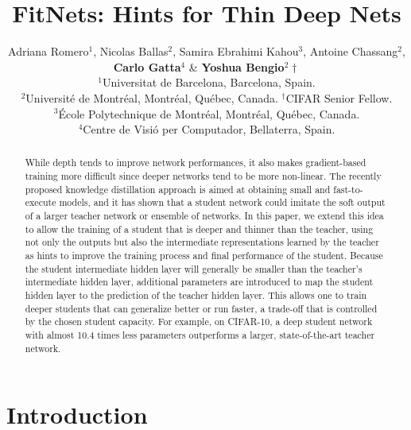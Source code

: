 \documentclass{article} %
\title{FitNets: Hints for Thin Deep Nets}
\author{
Adriana Romero$^1$, Nicolas Ballas$^2$, Samira Ebrahimi Kahou$^3$, Antoine Chassang$^2$,\\
{\bf Carlo Gatta$^4$} \& {\bf Yoshua Bengio$^2\dagger$}\\
$^1$Universitat de Barcelona, Barcelona, Spain. \\
$^2$Universit\'e de Montr\'eal, Montr\'eal, Qu\'ebec, Canada. $^\dagger$CIFAR Senior Fellow.\\
$^3$\'Ecole Polytechnique de Montr\'eal, Montr\'eal, Qu\'ebec, Canada. \\
$^4$Centre de Visi\'o per Computador, Bellaterra, Spain.
}
\begin{document}
\maketitle


\begin{abstract}
While depth tends to improve network performances, it also makes
gradient-based training more difficult since deeper networks tend to be more
non-linear. The recently proposed knowledge distillation approach is aimed at obtaining small
and fast-to-execute models, and it has shown that a student network could imitate
the soft output of a larger teacher network or ensemble of networks.  In this
paper, we extend this idea to allow the training of a student that is deeper and
thinner than the teacher, using not only the outputs but also the intermediate
representations learned by the teacher as hints to improve the training process
and final performance of
the student. Because the student intermediate hidden layer will generally be
smaller than the teacher's intermediate hidden layer, additional parameters
are introduced to map the student hidden layer to the prediction of the
teacher hidden layer. This allows one to train deeper students that can
generalize better or run faster, a trade-off that is controlled by the chosen
student capacity. For example, on CIFAR-10, a deep student network
with almost 10.4 times less parameters outperforms a larger,
state-of-the-art teacher network.


\end{abstract}

\vspace*{-1mm}
\section{Introduction}
\vspace*{-1mm}
\end{document}
